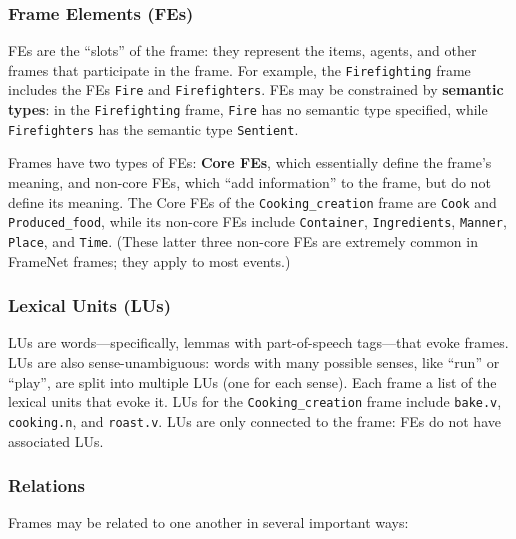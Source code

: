 \subsubsection{Frame Elements (FEs)}
FEs are the ``slots'' of the frame: they represent the items, agents, and other frames that participate in the frame. For example, the \texttt{Firefighting} frame includes the FEs \texttt{Fire} and \texttt{Firefighters}. FEs may be constrained by \textbf{semantic types}: in the \texttt{Firefighting} frame, \texttt{Fire} has no semantic type specified, while \texttt{Firefighters} has the semantic type \texttt{Sentient}.

Frames have two types of FEs: \textbf{Core FEs}, which essentially define the frame's meaning, and non-core FEs, which ``add information'' to the frame, but do not define its meaning. The Core FEs of the \texttt{Cooking\_creation} frame are \texttt{Cook} and \texttt{Produced\_food}, while its non-core FEs include \texttt{Container}, \texttt{Ingredients}, \texttt{Manner}, \texttt{Place}, and \texttt{Time}. (These latter three non-core FEs are extremely common in FrameNet frames; they apply to most events.)

\subsubsection{Lexical Units (LUs)}
LUs are words---specifically, lemmas with part-of-speech tags---that evoke frames. LUs are also sense-unambiguous: words with many possible senses, like ``run'' or ``play'', are split into multiple LUs (one for each sense). Each frame a list of the lexical units that evoke it. LUs for the \texttt{Cooking\_creation} frame include \texttt{bake.v}, \texttt{cooking.n}, and \texttt{roast.v}. LUs are only connected to the frame: FEs do not have associated LUs.

\subsubsection{Relations}
Frames may be related to one another in several important ways:

